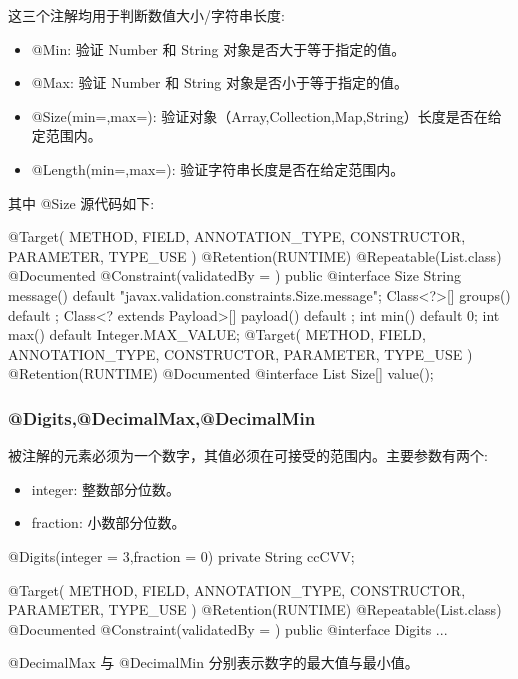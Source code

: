 这三个注解均用于判断数值大小/字符串长度:
\begin{itemize}
    \item @Min: 验证 Number 和 String 对象是否大于等于指定的值。
    \item @Max: 验证 Number 和 String 对象是否小于等于指定的值。
    \item @Size(min=,max=): 验证对象（Array,Collection,Map,String）长度是否在给定范围内。
    \item @Length(min=,max=): 验证字符串长度是否在给定范围内。
\end{itemize}

其中 @Size 源代码如下:
\begin{Java}
@Target({ METHOD, FIELD, ANNOTATION_TYPE, CONSTRUCTOR, PARAMETER, TYPE_USE })
@Retention(RUNTIME)
@Repeatable(List.class)
@Documented
@Constraint(validatedBy = { })
public @interface Size {
    String message() default "{javax.validation.constraints.Size.message}";
    Class<?>[] groups() default { };
    Class<? extends Payload>[] payload() default { };
    int min() default 0;
    int max() default Integer.MAX_VALUE;
    @Target({ METHOD, FIELD, ANNOTATION_TYPE, CONSTRUCTOR, PARAMETER, TYPE_USE })
    @Retention(RUNTIME)
    @Documented
    @interface List {
        Size[] value();
    }
}
\end{Java}

\subsubsection{@Digits,@DecimalMax,@DecimalMin}

被注解的元素必须为一个数字，其值必须在可接受的范围内。主要参数有两个:
\begin{itemize}
    \item integer: 整数部分位数。
    \item fraction: 小数部分位数。
\end{itemize}

\begin{Java}
@Digits(integer = 3,fraction = 0)
private String ccCVV;
\end{Java}

\begin{Java}
@Target({ METHOD, FIELD, ANNOTATION_TYPE, CONSTRUCTOR, PARAMETER, TYPE_USE })
@Retention(RUNTIME)
@Repeatable(List.class)
@Documented
@Constraint(validatedBy = { })
public @interface Digits {
    ...
}
\end{Java}

@DecimalMax 与 @DecimalMin 分别表示数字的最大值与最小值。

